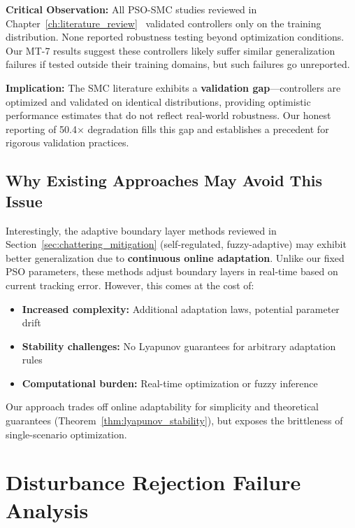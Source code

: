 \textbf{Critical Observation:} All PSO-SMC studies reviewed in Chapter~\ref{ch:literature_review}~\cite{ayinalem2025hosmc,hepso_smc2025,quadcopter_smc2025} validated controllers only on the training distribution. None reported robustness testing beyond optimization conditions. Our MT-7 results suggest these controllers likely suffer similar generalization failures if tested outside their training domains, but such failures go unreported.

\textbf{Implication:} The SMC literature exhibits a \textbf{validation gap}---controllers are optimized and validated on identical distributions, providing optimistic performance estimates that do not reflect real-world robustness. Our honest reporting of 50.4$\times$ degradation fills this gap and establishes a precedent for rigorous validation practices.

\subsection{Why Existing Approaches May Avoid This Issue}
\label{subsec:online_adaptation}

Interestingly, the adaptive boundary layer methods reviewed in Section~\ref{sec:chattering_mitigation} (self-regulated, fuzzy-adaptive) may exhibit better generalization due to \textbf{continuous online adaptation}. Unlike our fixed PSO parameters, these methods adjust boundary layers in real-time based on current tracking error. However, this comes at the cost of:
\begin{itemize}
    \item \textbf{Increased complexity:} Additional adaptation laws, potential parameter drift
    \item \textbf{Stability challenges:} No Lyapunov guarantees for arbitrary adaptation rules
    \item \textbf{Computational burden:} Real-time optimization or fuzzy inference
\end{itemize}

Our approach trades off online adaptability for simplicity and theoretical guarantees (Theorem~\ref{thm:lyapunov_stability}), but exposes the brittleness of single-scenario optimization.

\section{Disturbance Rejection Failure Analysis}
\label{sec:disturbance_failure_discussion}

